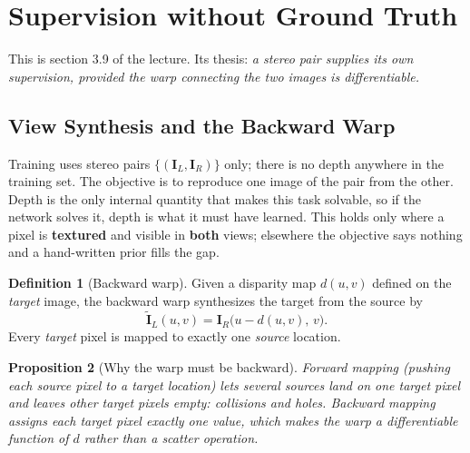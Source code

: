 \documentclass[11pt,a4paper]{article}
\theoremstyle{definition}
\newtheorem{definition}{Definition}[section]
\theoremstyle{plain}
\newtheorem{proposition}[definition]{Proposition}
\theoremstyle{remark}
\begin{document}
\section{Supervision without Ground Truth }
This is section 3.9 of the lecture. Its thesis: \emph{a stereo pair supplies its own supervision, provided the warp connecting the two images is differentiable.}

\subsection{View Synthesis and the Backward Warp }
Training uses stereo pairs $\{(\bm I_L,\bm I_R)\}$ only; there is no depth anywhere in the training set. The objective is to reproduce one image of the pair from the other. Depth is the only internal quantity that makes this task solvable, so if the network solves it, depth is what it must have learned. This holds only where a pixel is \textbf{textured} and visible in \textbf{both} views; elsewhere the objective says nothing and a hand-written prior fills the gap.

\begin{definition}[Backward warp]
Given a disparity map $d(u,v)$ defined on the \emph{target} image, the backward warp synthesizes the target from the source by
\begin{equation}
\tilde{\bm I}_L(u,v)=\bm I_R\bigl(u-d(u,v),\,v\bigr).
\end{equation}
Every \emph{target} pixel is mapped to exactly one \emph{source} location.
\end{definition}

\begin{proposition}[Why the warp must be backward]
Forward mapping (pushing each source pixel to a target location) lets several sources land on one target pixel and leaves other target pixels empty: collisions and holes. Backward mapping assigns each target pixel exactly one value, which makes the warp a \emph{differentiable function} of $d$ rather than a scatter operation.
\end{proposition}
\end{document}
